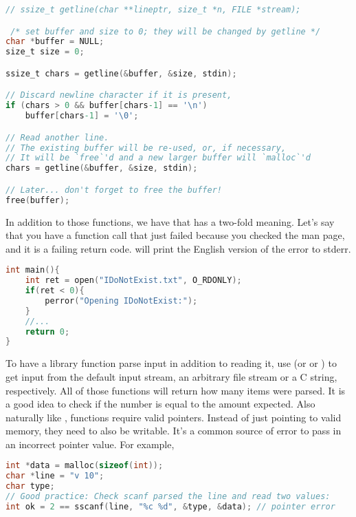 \begin{lstlisting}[language=C]
// ssize_t getline(char **lineptr, size_t *n, FILE *stream);

 /* set buffer and size to 0; they will be changed by getline */
char *buffer = NULL;
size_t size = 0;

ssize_t chars = getline(&buffer, &size, stdin);

// Discard newline character if it is present,
if (chars > 0 && buffer[chars-1] == '\n')
    buffer[chars-1] = '\0';

// Read another line.
// The existing buffer will be re-used, or, if necessary,
// It will be `free`'d and a new larger buffer will `malloc`'d
chars = getline(&buffer, &size, stdin);

// Later... don't forget to free the buffer!
free(buffer);
\end{lstlisting}

In addition to those functions, we have  that has a two-fold meaning.
Let's say that you have a function call that just failed because you checked the man page, and it is a failing return code.
 will print the English version of the error to stderr.

\begin{lstlisting}[language=C]
int main(){
    int ret = open("IDoNotExist.txt", O_RDONLY);
    if(ret < 0){
        perror("Opening IDoNotExist:");
    }
    //...
    return 0;
}
\end{lstlisting}

To have a library function parse input in addition to reading it, use  (or  or ) to get input from the default input stream, an arbitrary file stream or a C string, respectively.
All of those functions will return how many items were parsed.
It is a good idea to check if the number is equal to the amount expected.
Also naturally like ,  functions require valid pointers.
Instead of just pointing to valid memory, they need to also be writable.
It's a common source of error to pass in an incorrect pointer value.
For example,

\begin{lstlisting}[language=C]
int *data = malloc(sizeof(int));
char *line = "v 10";
char type;
// Good practice: Check scanf parsed the line and read two values:
int ok = 2 == sscanf(line, "%c %d", &type, &data); // pointer error
\end{lstlisting}

